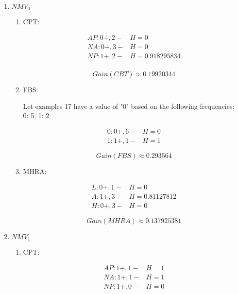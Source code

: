 \begin{enumerate}
\begin{enumerate}
\begin{enumerate}
					\item{\( NMV_0 \) }
				
						\begin{enumerate}
							
							\item{CPT:}
							
								\[
									\begin{array}{l|l}
										AP: 0+, 2- & H = 0 \\
										NA: 0+, 3- & H = 0 \\
										NP: 1+, 2- & H = 0.918295834 \\
									\end{array}
								\]
								
								\[
									Gain(CBT) \approx 0.19920344
								\]
						
							\item{FBS:}
							
								Let examples 17 have a value of "0" based on the following frequencies: \\
								0: 5, 1: 2
								
								\[
									\begin{array}{l|l}
										0: 0+, 6- & H = 0 \\
										1: 1+, 1- & H = 1
									\end{array}
								\]
								
								\[
									Gain(FBS) \approx 0.293564
								\]
							
							\item{MHRA:}
								
								\[
									\begin{array}{l|l}
										L: 0+, 1- & H = 0 \\
										A: 1+, 3- & H = 0.81127812 \\
										H: 0+, 3- & H = 0
									\end{array}
								\]
								
								\[
									Gain(MHRA) \approx 0.137925381
								\]
						
						\end{enumerate}
				
					\item{\( NMV_1 \) }
				
						\begin{enumerate}
							
							\item{CPT:}
							
								\[
									\begin{array}{l|l}
										AP: 1+, 1- & H = 1 \\
										NA: 1+, 1- & H = 1 \\
										NP: 1+, 0- & H = 0 \\
									\end{array}
								\]
								

\end{enumerate}
\end{enumerate}
\end{enumerate}
\end{enumerate}
